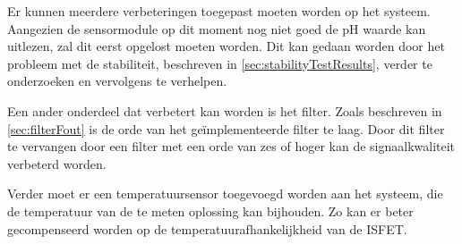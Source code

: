 Er kunnen meerdere verbeteringen toegepast moeten worden op het systeem. Aangezien de sensormodule op dit moment nog niet goed de pH waarde kan uitlezen, zal dit eerst opgelost moeten worden. Dit kan gedaan worden door het probleem met de stabiliteit, beschreven in \cref{sec:stabilityTestResults}, verder te onderzoeken en vervolgens te verhelpen.

Een ander onderdeel dat verbetert kan worden is het filter. Zoals beschreven in \cref{sec:filterFout} is de orde van het geïmplementeerde filter te laag. Door dit filter te vervangen door een filter met een orde van zes of hoger kan de signaalkwaliteit verbeterd worden.

Verder moet er een temperatuursensor toegevoegd worden aan het systeem, die de temperatuur van de te meten oplossing kan bijhouden. Zo kan er beter gecompenseerd worden op de temperatuurafhankelijkheid van de ISFET.





